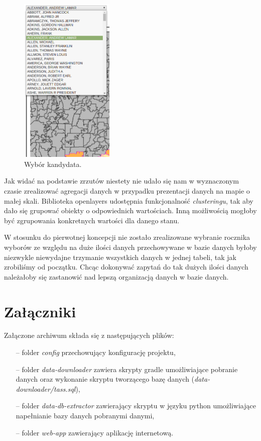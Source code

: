 \documentclass[10pt,a4paper]{article}
\begin{document}
\begin{figure}[H]
    \centering
    \includegraphics[width=0.4\textwidth]{selector.png}
    \caption{Wybór kandydata.}
\end{figure}

Jak widać na podstawie zrzutów niestety nie udało się nam w wyznaczonym czasie zrealizować agregacji danych w przypadku prezentacji danych na mapie o małej skali. Biblioteka openlayers udostępnia funkcjonalność \textit{clusteringu}, tak aby dało się grupować obiekty o odpowiednich wartościach. Inną możliwością mogłoby być zgrupowania konkretnych wartości dla danego stanu.

W stosunku do pierwotnej koncepcji nie zostało zrealizowane wybranie rocznika wyborów ze względu na duże ilości danych przechowywane w bazie danych byłoby niezwykle niewydajne trzymanie wszystkich danych w jednej tabeli, tak jak zrobiliśmy od początku. Chcąc dokonywać zapytań do tak dużych ilości danych należałoby się zastanowić nad lepszą organizacją danych w bazie danych.

\section{Załączniki}
Załączone archiwum składa się z następujących plików:
\begin{itemize}
\item[--] folder \textit{config} przechowujący konfigurację projektu,
\item[--] folder \textit{data-downloader} zawiera skrypty gradle umożliwiające pobranie danych oraz wykonanie skryptu tworzącego bazę danych (\textit{data-downloader/tass.sql}),
\item[--] folder \textit{data-db-extractor} zawierający skryptu w języku python umożliwiające napełnianie bazy danych pobranymi danymi,
\item[--] folder \textit{web-app} zawierający aplikację internetową.
\end{itemize}
\end{document}
